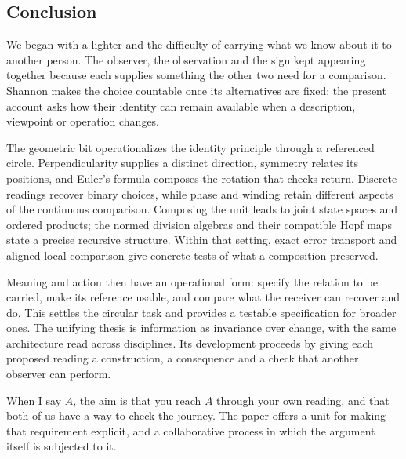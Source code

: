 \documentclass[11pt,a4paper]{article}
\begin{document}
\subsection{Conclusion}
We began with a lighter and the difficulty of carrying what we know about it
to another person. The observer, the observation and the sign kept appearing
together because each supplies something the other two need for a comparison.
Shannon makes the choice countable once its alternatives are fixed; the
present account asks how their identity can remain available when a
description, viewpoint or operation changes.

The geometric bit operationalizes the identity principle through a referenced
circle. Perpendicularity supplies a distinct direction, symmetry relates its
positions, and Euler's formula composes the rotation that checks return.
Discrete readings recover binary choices, while phase and winding retain
different aspects of the continuous comparison. Composing the unit leads to
joint state spaces and ordered products; the normed division algebras and
their compatible Hopf maps state a precise recursive structure. Within that
setting, exact error transport and aligned local comparison give concrete
tests of what a composition preserved.

Meaning and action then have an operational form: specify the relation to be
carried, make its reference usable, and compare what the receiver can recover
and do. This settles the circular task and provides a testable specification
for broader ones. The unifying thesis is information as invariance over
change, with the same architecture read across disciplines. Its development
proceeds by giving each proposed reading a construction, a consequence and a
check that another observer can perform.

When I say $A$, the aim is that you reach $A$ through your own reading, and
that both of us have a way to check the journey. The paper offers a unit for
making that requirement explicit, and a collaborative process in which the
argument itself is subjected to it.

\clearpage
\appendix
\end{document}
